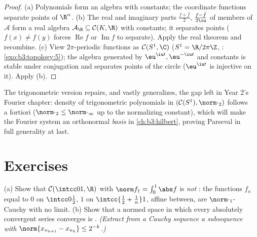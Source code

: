 \begin{proof}
(a) Polynomials form an algebra with constants; the coordinate
functions separate points of $\R^n$.
(b) The real and imaginary parts $\frac{f + \bar f}2$,
$\frac{f - \bar f}{2\iu}$ of members of $\mathcal A$ form a
real algebra $\mathcal A_\R \subseteq \mathcal C(K, \R)$ with
constants; it separates points ($f(x) \ne f(y)$ forces
$\operatorname{Re}f$ or $\operatorname{Im}f$ to separate).
Apply the real theorem and recombine.
(c) View $2\pi$-periodic functions as $\mathcal C(S^1, \C)$
($S^1 = \R/2\pi\Z$, :
\cref{exo:b3:topology:5}); the algebra generated by
$\eu^{\iu t}, \eu^{-\iu t}$ and constants is stable under
conjugation and separates points of the circle ($\eu^{\iu t}$
is injective on it). Apply (b).
\end{proof}

\begin{remark}\label{rem:b3:complete:swremark}
The trigonometric version repairs, and vastly generalizes, the
gap left in Year 2's Fourier chapter: density of trigonometric
polynomials in $(\mathcal C(S^1), \norm\cdot_2)$ follows a
fortiori ($\norm\cdot_2 \leq \norm\cdot_\infty$ up to the
normalizing constant), which will make the Fourier system an
orthonormal \emph{basis} in \cref{ch:b3:hilbert}, proving
Parseval in full generality at last.
\end{remark}

\section{Exercises}

\begin{exercise}[$\star$]\label{exo:b3:complete:1}
(a) Show that $\mathcal C(\intcc01, \R)$ with
$\norm f_1 = \int_0^1\abs f$ is \emph{not} : the
functions $f_n$ equal to $0$ on $\intcc0{\frac12}$, $1$ on
$\intcc{\frac12 + \frac1n}1$, affine between, are
$\norm\cdot_1$-Cauchy with no  limit.
(b) Show that a normed space in which every absolutely
convergent series converges is . \emph{(Extract from a
Cauchy sequence a subsequence with $\norm{x_{n_{k+1}} -
x_{n_k}} \leq 2^{-k}$.)}
\end{exercise}

